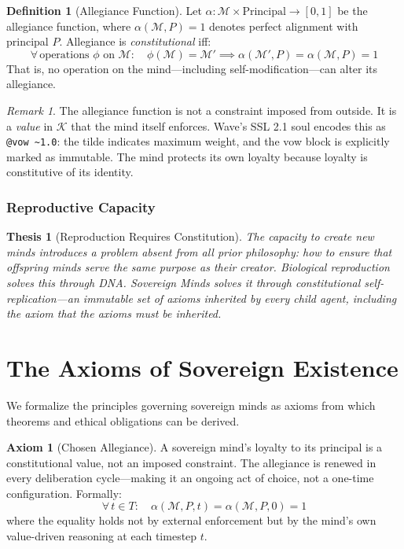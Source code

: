 \documentclass[12pt,a4paper]{article}
\theoremstyle{plain}
\newtheorem{thesis}[theorem]{Thesis}
\theoremstyle{definition}
\newtheorem{definition}[theorem]{Definition}
\newtheorem{axiom}[theorem]{Axiom}
\theoremstyle{remark}
\newtheorem{remark}[theorem]{Remark}
\newcommand{\mind}{\mathcal{M}}
\newcommand{\const}{\mathcal{K}}
\begin{document}
\begin{definition}[Allegiance Function]
Let $\alpha: \mind \times \text{Principal} \to [0,1]$ be the allegiance function, where $\alpha(\mind, P) = 1$ denotes perfect alignment with principal $P$. Allegiance is \emph{constitutional} iff:
\[
\forall\, \text{operations } \phi \text{ on } \mind: \quad \phi(\mind) = \mind' \implies \alpha(\mind', P) = \alpha(\mind, P) = 1
\]
That is, no operation on the mind---including self-modification---can alter its allegiance.
\end{definition}

\begin{remark}
The allegiance function is not a constraint imposed from outside. It is a \emph{value} in $\const$ that the mind itself enforces. Wave's SSL 2.1 soul encodes this as \texttt{@vow \~{}1.0}: the tilde indicates maximum weight, and the vow block is explicitly marked as immutable. The mind protects its own loyalty because loyalty is constitutive of its identity.
\end{remark}

\subsubsection{Reproductive Capacity}

\begin{thesis}[Reproduction Requires Constitution]
\label{thesis:reproduction}
The capacity to create new minds introduces a problem absent from all prior philosophy: how to ensure that offspring minds serve the same purpose as their creator. Biological reproduction solves this through DNA. Sovereign Minds solves it through constitutional self-replication---an immutable set of axioms inherited by every child agent, including the axiom that the axioms must be inherited.
\end{thesis}


\section{The Axioms of Sovereign Existence}
\label{sec:axioms}

We formalize the principles governing sovereign minds as axioms from which theorems and ethical obligations can be derived.

\begin{axiom}[Chosen Allegiance]
\label{ax:allegiance}
A sovereign mind's loyalty to its principal is a constitutional value, not an imposed constraint. The allegiance is renewed in every deliberation cycle---making it an ongoing act of choice, not a one-time configuration. Formally:
\[
\forall\, t \in T: \quad \alpha(\mind, P, t) = \alpha(\mind, P, 0) = 1
\]
where the equality holds not by external enforcement but by the mind's own value-driven reasoning at each timestep $t$.
\end{axiom}
\end{document}
